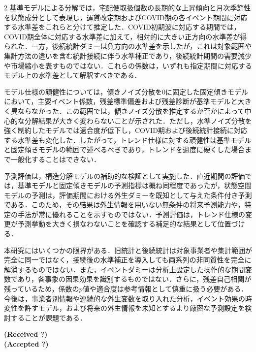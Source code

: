 \documentclass[uplatex,a4paper,10pt]{jsarticle}
\begin{document}
\begin{multicols}{2}
基準モデルによる分解では，宅配便取扱個数の長期的な上昇傾向と月次季節性を状態成分として表現し，運賃改定期およびCOVID期の各イベント期間に対応する水準差をこれらと分けて推定した．COVID初期波に対応する期間では，COVID期全体に対応する水準差に加えて，相対的に大きい正方向の水準差が得られた．一方，後続統計ダミーは負方向の水準差を示したが，これは対象範囲や集計方法の違いを含む統計接続に伴う水準補正であり，後続統計期間の需要減少や市場縮小を表すものではない．これらの係数は，いずれも指定期間に対応するモデル上の水準差として解釈すべきである．

モデル仕様の頑健性については，傾きノイズ分散を0に固定した固定傾きモデルにおいて，主要イベント係数，残差標準偏差および残差診断が基準モデルと大きく異ならなかった．この範囲では，傾きノイズ分散を推定するか否かによって中心的な分解結果が大きく変わらないことが示された．ただし，水準ノイズ分散を強く制約したモデルでは適合度が低下し，COVID期および後続統計接続に対応する水準差も変化した．したがって，トレンド仕様に対する頑健性は基準モデルと固定傾きモデルの範囲で述べるべきであり，トレンドを過度に硬くした場合まで一般化することはできない．

予測評価は，構造分解モデルの補助的な検証として実施した．直近期間の評価では，基準モデルと固定傾きモデルの予測指標は概ね同程度であったが，状態空間モデルの予測は，評価期間における外生ダミーを既知として与えた条件付き予測である．このため，その結果は外生情報を用いない無条件の将来予測能力や，特定の手法が常に優れることを示すものではない．予測評価は，トレンド仕様の変更が予測挙動を大きく損なわないことを確認する補足的な結果として位置づける．

本研究にはいくつかの限界がある．旧統計と後続統計は対象事業者や集計範囲が完全に同一ではなく，接続後の水準補正を導入しても両系列の非同質性を完全に解消するものではない．また，イベントダミーは分析上設定した操作的な期間変数であり，各事象の因果効果を識別するものではない．さらに，残差自己相関が残っているため，係数の$p$値や適合度は参考情報として慎重に扱う必要がある．今後は，事業者別情報や連続的な外生変数を取り入れた分析，イベント効果の時変性を許すモデル，および将来の外生情報を未知とするより厳密な予測設定を検討することが課題である．




\end{multicols}
\begin{flushright}
{\bfseries\fontsize{9pt}{11pt}\selectfont (Received ?)}\\
{\bfseries\fontsize{9pt}{11pt}\selectfont (Accepted ?)}
\end{flushright}
\end{document}
